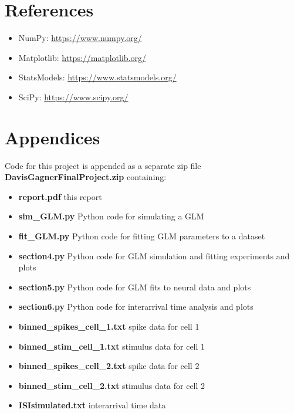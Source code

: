 \documentclass[letterpaper,titlepage,10pt]{article}
\begin{document}
\section{References}

\begin{itemize}
\item NumPy: \url{https://www.numpy.org/}
\item Matplotlib: \url{https://matplotlib.org/}
\item StatsModels: \url{https://www.statsmodels.org/}
\item SciPy: \url{https://www.scipy.org/}
\end{itemize}

\section{Appendices}

Code for this project is appended as a separate zip file \textbf{DavisGagnerFinalProject.zip} containing:

\begin{itemize}
\item \textbf{report.pdf} this report
\item \textbf{sim\_GLM.py} Python code for simulating a GLM
\item \textbf{fit\_GLM.py} Python code for fitting GLM parameters to a dataset
\item \textbf{section4.py} Python code for GLM simulation and fitting experiments and plots
\item \textbf{section5.py} Python code for GLM fits to neural data and plots
\item \textbf{section6.py} Python code for interarrival time analysis and plots
\item \textbf{binned\_spikes\_cell\_1.txt} spike data for cell 1
\item \textbf{binned\_stim\_cell\_1.txt} stimulus data for cell 1
\item \textbf{binned\_spikes\_cell\_2.txt} spike data for cell 2
\item \textbf{binned\_stim\_cell\_2.txt} stimulus data for cell 2
\item \textbf{ISIsimulated.txt} interarrival time data
\end{itemize}
\end{document}
